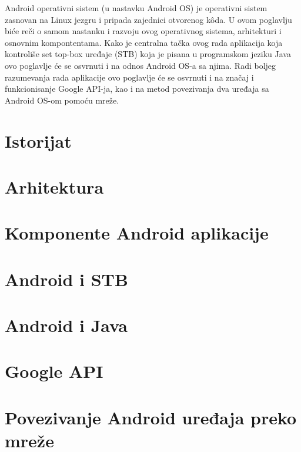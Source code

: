 \documentclass[../TamaraIvanovicMasterRad.tex]{subfiles}
\begin{document}
Android operativni sistem (u nastavku Android OS) je operativni sistem zasnovan na Linux jezgru i pripada zajednici otvorenog k\^{o}da. U ovom poglavlju biće reči o samom nastanku i razvoju ovog operativnog sistema, arhitekturi i osnovnim kompontentama. Kako je centralna tačka ovog rada aplikacija koja kontroliše set top-box uređaje (STB) koja je pisana u programskom jeziku Java ovo poglavlje će se osvrnuti i na odnos Android OS-a sa njima. Radi boljeg razumevanja rada aplikacije ovo poglavlje će se osvrnuti i na značaj i funkcionisanje Google API-ja, kao i na metod povezivanja dva uređaja sa Android OS-om pomoću mreže. 
\section{Istorijat}



\section{Arhitektura}



\section{Komponente Android aplikacije}


\section{Android i STB}
\section{Android i Java}
\section{Google API}
\section{Povezivanje Android uređaja preko mreže}
\end{document}
